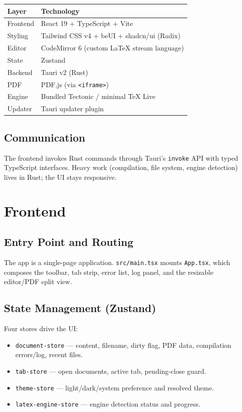 \documentclass[11pt,a4paper]{report}
\begin{document}
\begin{center}
\begin{tabular}{ll}
\toprule
\textbf{Layer} & \textbf{Technology} \\
\midrule
Frontend & React 19 + TypeScript + Vite \\
Styling  & Tailwind CSS v4 + beUI + shadcn/ui (Radix) \\
Editor   & CodeMirror 6 (custom LaTeX stream language) \\
State    & Zustand \\
Backend  & Tauri v2 (Rust) \\
PDF      & PDF.js (via \texttt{<iframe>}) \\
Engine   & Bundled Tectonic / minimal TeX Live \\
Updater  & Tauri updater plugin \\
\bottomrule
\end{tabular}
\end{center}

\section{Communication}
The frontend invokes Rust commands through Tauri's \texttt{invoke} API with typed TypeScript interfaces. Heavy work (compilation, file system, engine detection) lives in Rust; the UI stays responsive.

\chapter{Frontend}

\section{Entry Point and Routing}
The app is a single-page application. \texttt{src/main.tsx} mounts \texttt{App.tsx}, which composes the toolbar, tab strip, error list, log panel, and the resizable editor/PDF split view.

\section{State Management (Zustand)}
Four stores drive the UI:
\begin{itemize}
  \item \texttt{document-store} — content, filename, dirty flag, PDF data, compilation errors/log, recent files.
  \item \texttt{tab-store} — open documents, active tab, pending-close guard.
  \item \texttt{theme-store} — light/dark/system preference and resolved theme.
  \item \texttt{latex-engine-store} — engine detection status and progress.
\end{itemize}
\end{document}
